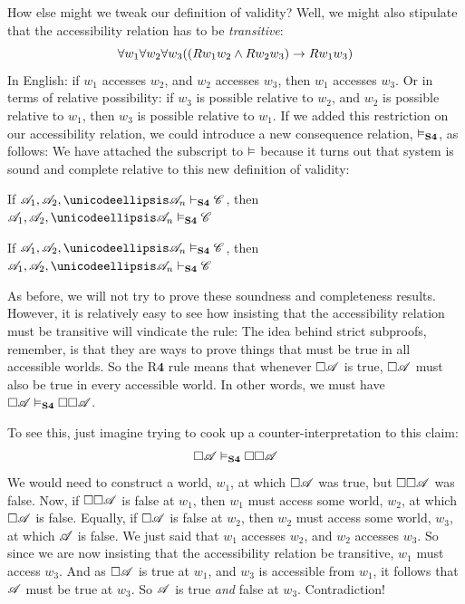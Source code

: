 How else might we tweak our definition of validity? Well, we might also stipulate that the accessibility relation has to be \emph{transitive}:
\[\forall w_1\forall w_2\forall w_3 ((Rw_1w_2 \wedge Rw_2w_3)\rightarrow Rw_1w_3)\]
In English: if $w_1$ accesses $w_2$, and $w_2$ accesses $w_3$, then $w_1$ accesses $w_3$. Or in terms of relative possibility: if $w_3$ is possible relative to $w_2$, and $w_2$ is possible relative to $w_1$, then $w_3$ is possible relative to $w_1$. If we added this restriction on our accessibility relation, we could introduce a new consequence relation, $\vDash_{\mathbf{S4}}$, as follows:
We have attached the \mlSfour{} subscript to $\vDash$ because it turns out that system \mlSfour{} is sound and complete relative to this new definition of validity:
\begin{compactlist}
	\item If $\metav{A}_1,\metav{A}_2, \dots \metav{A}_n\proves_\mlSfour\metav{C}$, then $\metav{A}_1,\metav{A}_2, \dots \metav{A}_n\entails_\mlSfour\metav{C}$
	\item If $\metav{A}_1,\metav{A}_2, \dots \metav{A}_n\entails_\mlSfour\metav{C}$, then $\metav{A}_1,\metav{A}_2, \dots \metav{A}_n\proves_\mlSfour\metav{C}$
\end{compactlist}
As before, we will not try to prove these soundness and completeness results. However, it is relatively easy to see how insisting that the accessibility relation must be transitive will vindicate the \mlSfour{} rule:
The idea behind strict subproofs, remember, is that they are ways to prove things that must be true in all accessible worlds. So the R$\mathbf{4}$ rule means that whenever $\Box \mathscr{A}$ is true, $\Box \mathscr{A}$ must also be true in every accessible world. In other words, we must have $\Box\mathscr{A} \vDash_{\mathbf{S4}} \Box\Box\mathscr{A}$.

To see this, just imagine trying to cook up a counter-interpretation to this claim:
\[\Box\mathscr{A} \vDash_{\mathbf{S4}} \Box \Box \mathscr{A}\]
We would need to construct a world, $w_1$, at which $\Box\mathscr{A}$ was true, but $\Box \Box \mathscr{A}$ was false. Now, if $\Box \Box \mathscr{A}$ is false at $w_1$, then $w_1$ must access some world, $w_2$, at which $\Box\mathscr{A}$ is false. Equally, if $\Box \mathscr{A}$ is false at $w_2$, then $w_2$ must access some world, $w_3$, at which $\mathscr{A}$ is false. We just said that $w_1$ accesses $w_2$, and $w_2$ accesses $w_3$. So since we are now insisting that the accessibility relation be transitive, $w_1$ must access $w_3$. And as $\Box\mathscr{A}$ is true at $w_1$, and $w_3$ is accessible from $w_1$, it follows that $\mathscr{A}$ must be true at $w_3$. So $\mathscr{A}$ is true \emph{and} false at $w_3$. Contradiction!

